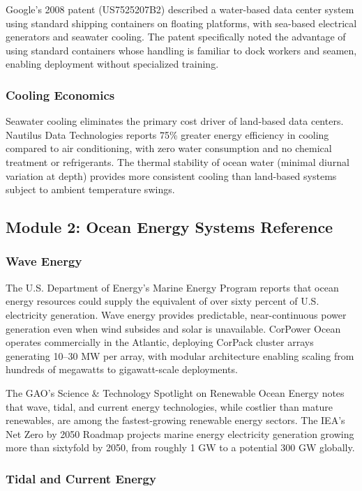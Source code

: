 \documentclass[11pt,letterpaper]{article}
\begin{document}
Google's 2008 patent (US7525207B2) described a water-based data center system using standard shipping containers on floating platforms, with sea-based electrical generators and seawater cooling. The patent specifically noted the advantage of using standard containers whose handling is familiar to dock workers and seamen, enabling deployment without specialized training.

\subsubsection{Cooling Economics}

Seawater cooling eliminates the primary cost driver of land-based data centers. Nautilus Data Technologies reports 75\% greater energy efficiency in cooling compared to air conditioning, with zero water consumption and no chemical treatment or refrigerants. The thermal stability of ocean water (minimal diurnal variation at depth) provides more consistent cooling than land-based systems subject to ambient temperature swings.

\subsection{Module 2: Ocean Energy Systems Reference}

\subsubsection{Wave Energy}

The U.S. Department of Energy's Marine Energy Program reports that ocean energy resources could supply the equivalent of over sixty percent of U.S. electricity generation. Wave energy provides predictable, near-continuous power generation even when wind subsides and solar is unavailable. CorPower Ocean operates commercially in the Atlantic, deploying CorPack cluster arrays generating 10--30 MW per array, with modular architecture enabling scaling from hundreds of megawatts to gigawatt-scale deployments.

The GAO's Science \& Technology Spotlight on Renewable Ocean Energy notes that wave, tidal, and current energy technologies, while costlier than mature renewables, are among the fastest-growing renewable energy sectors. The IEA's Net Zero by 2050 Roadmap projects marine energy electricity generation growing more than sixtyfold by 2050, from roughly 1 GW to a potential 300 GW globally.

\subsubsection{Tidal and Current Energy}
\end{document}
